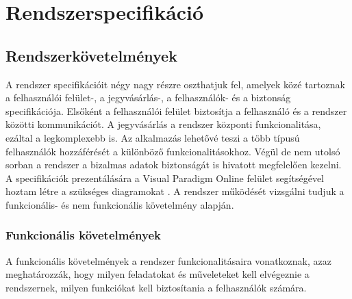 \chapter{Rendszerspecifikáció} \label{fejezet3}

\section {Rendszerkövetelmények}

A rendszer specifikációit négy nagy részre oszthatjuk fel, amelyek közé tartoznak a felhasználói felület-, a jegyvásárlás-, a felhasználók- és a biztonság specifikációja. Elsőként a felhasználói felület biztosítja a felhasználó és a rendszer közötti kommunikációt. A jegyvásárlás a rendszer központi funkcionalitása, ezáltal a legkomplexebb is. Az alkalmazás lehetővé teszi a több típusú felhasználók hozzáférését a különböző funkcionalitásokhoz. Végül de nem utolsó sorban a rendszer a bizalmas adatok biztonságát is hivatott megfelelően kezelni. A specifikációk prezentálására a Visual Paradigm Online felület segítségével hoztam létre a szükséges diagramokat \cite{VPO}. A rendszer működését vizsgálni tudjuk a funkcionális- és nem funkcionális követelmény alapján.

\subsection {Funkcionális követelmények} \label{rendszerFunkcionális}

A funkcionális követelmények a rendszer funkcionalitásaira vonatkoznak, azaz meghatározzák, hogy milyen feladatokat és műveleteket kell elvégeznie a rendszernek, milyen funkciókat kell biztosítania a felhasználók számára.


